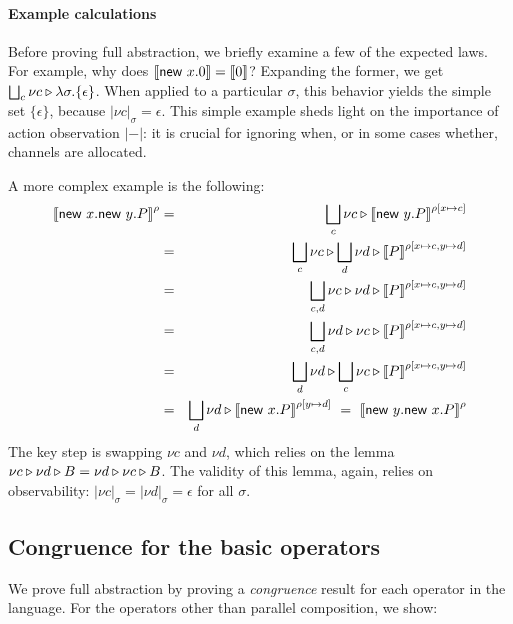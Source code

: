 \documentclass{entcs}
\begin{document}
\paragraph{Example calculations}

Before proving full abstraction, we briefly examine a few of the
expected laws.  For example, why does $\left\llbracket \textsf{new } x.0 \right\rrbracket = \left\llbracket 0 \right\rrbracket$?
Expanding the former, we get $\bigsqcup_c \nu c \triangleright \lambda \sigma
. \{ \epsilon \}$.  When applied to a particular $\sigma$, this
behavior yields the simple set $\{ \epsilon \}$, because $|\nu
c|_\sigma = \epsilon$.  This simple example sheds light on the
importance of action observation $|-|$: it is crucial for ignoring
when, or in some cases whether, channels are allocated.

A more complex example is the following:
\begin{eqnarray*}
  \left\llbracket \textsf{new } x.\textsf{new } y.P \right\rrbracket^{\rho}
&=&
  \bigsqcup_c \nu c \triangleright \left\llbracket \textsf{new } y.P \right\rrbracket^{\rho[x \mapsto c]} \\
&=&
  \bigsqcup_c \nu c \triangleright \bigsqcup_d \nu d \triangleright \left\llbracket P \right\rrbracket^{\rho[x \mapsto c, y \mapsto d]} \\
&=&
  \bigsqcup_{c,d} \nu c \triangleright \nu d \triangleright \left\llbracket P \right\rrbracket^{\rho[x \mapsto c, y \mapsto d]} \\
&=&
  \bigsqcup_{c,d} \nu d \triangleright \nu c \triangleright \left\llbracket P \right\rrbracket^{\rho[x \mapsto c, y \mapsto d]} \\
&=&
  \bigsqcup_d \nu d \triangleright \bigsqcup_c \nu c \triangleright \left\llbracket P \right\rrbracket^{\rho[x \mapsto c, y \mapsto d]} \\
&=&
  \bigsqcup_d \nu d \triangleright \left\llbracket \textsf{new } x.P \right\rrbracket^{\rho[y \mapsto d]}
\ =\
  \left\llbracket \textsf{new } y.\textsf{new } x.P \right\rrbracket^{\rho}
\end{eqnarray*}
The key step is swapping $\nu c$ and $\nu d$, which relies on the
lemma $\nu c \triangleright \nu d \triangleright B = \nu d \triangleright \nu c \triangleright B$.  The
validity of this lemma, again, relies on observability: $|\nu c|_\sigma
= |\nu d|_\sigma = \epsilon$ for all $\sigma$.

\subsection{Congruence for the basic operators}

We prove full abstraction by proving a \emph{congruence} result for
each operator in the language.  For the operators other than parallel
composition, we show:
\end{document}
